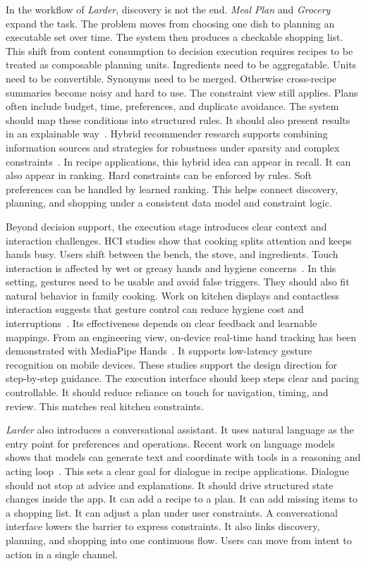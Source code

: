 \documentclass[journal]{IEEEtran}
\begin{document}
In the workflow of \textit{Larder}, discovery is not the end. \textit{Meal Plan} and \textit{Grocery} expand the task. The problem moves from choosing one dish to planning an executable set over time. The system then produces a checkable shopping list. This shift from content consumption to decision execution requires recipes to be treated as composable planning units. Ingredients need to be aggregatable. Units need to be convertible. Synonyms need to be merged. Otherwise cross-recipe summaries become noisy and hard to use. The constraint view still applies. Plans often include budget, time, preferences, and duplicate avoidance. The system should map these conditions into structured rules. It should also present results in an explainable way~\cite{chen2021personalized_food_kbqa}. Hybrid recommender research supports combining information sources and strategies for robustness under sparsity and complex constraints~\cite{burke2002hybrid_recommenders}. In recipe applications, this hybrid idea can appear in recall. It can also appear in ranking. Hard constraints can be enforced by rules. Soft preferences can be handled by learned ranking. This helps connect discovery, planning, and shopping under a consistent data model and constraint logic.

Beyond decision support, the execution stage introduces clear context and interaction challenges. HCI studies show that cooking splits attention and keeps hands busy. Users shift between the bench, the stove, and ingredients. Touch interaction is affected by wet or greasy hands and hygiene concerns~\cite{nansen2014kitchen_kinesics}. In this setting, gestures need to be usable and avoid false triggers. They should also fit natural behavior in family cooking. Work on kitchen displays and contactless interaction suggests that gesture control can reduce hygiene cost and interruptions~\cite{besevli2022gestural_kitchen}. Its effectiveness depends on clear feedback and learnable mappings. From an engineering view, on-device real-time hand tracking has been demonstrated with MediaPipe Hands~\cite{vakunov2020mediapipe_hands}. It supports low-latency gesture recognition on mobile devices. These studies support the design direction for step-by-step guidance. The execution interface should keep steps clear and pacing controllable. It should reduce reliance on touch for navigation, timing, and review. This matches real kitchen constraints.

\textit{Larder} also introduces a conversational assistant. It uses natural language as the entry point for preferences and operations. Recent work on language models shows that models can generate text and coordinate with tools in a reasoning and acting loop~\cite{yao2023react}. This sets a clear goal for dialogue in recipe applications. Dialogue should not stop at advice and explanations. It should drive structured state changes inside the app. It can add a recipe to a plan. It can add missing items to a shopping list. It can adjust a plan under user constraints. A conversational interface lowers the barrier to express constraints. It also links discovery, planning, and shopping into one continuous flow. Users can move from intent to action in a single channel.
\end{document}
